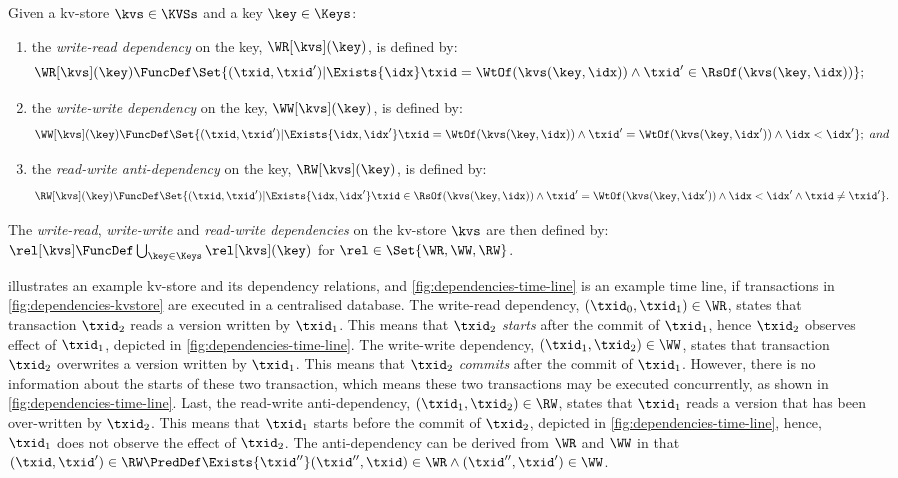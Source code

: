 

\begin{definition}
\label{def:dependency-kv-store}
Given a kv-store \(\kvs \in \KVSs\) and a key \( \key \in \Keys \):
\begin{enumerate}
\item the \emph{write-read dependency} on the key, \( \WR[\kvs](\key) \), is defined by:
    \[ 
    \WR[\kvs](\key) \FuncDef \Set{(\txid,\txid') | 
        \Exists{\idx} \txid = \WtOf(\kvs(\key,\idx)) \land \txid' \in \RsOf(\kvs(\key,\idx))} ;
    \]
\item the \emph{write-write dependency} on the key, \( \WW[\kvs](\key) \), is defined by:
    \[ 
    \WW[\kvs](\key) \FuncDef \Set{(\txid,\txid') | 
        \Exists{\idx,\idx'} \txid = \WtOf(\kvs(\key,\idx)) 
        \land \txid' = \WtOf(\kvs(\key,\idx')) \land \idx < \idx'}  ; \ and
    \]
\item the \emph{read-write anti-dependency} on the key, \( \RW[\kvs](\key) \), is defined by:
    \[ 
    \RW[\kvs](\key) \FuncDef \Set{(\txid,\txid') | 
        \Exists{\idx,\idx'} \txid \in \RsOf(\kvs(\key,\idx)) 
        \land \txid' = \WtOf(\kvs(\key,\idx')) 
        \land \idx < \idx' \land \txid \neq \txid'} .
    \]
\end{enumerate}
The \emph{write-read}, \emph{write-write} and \emph{read-write dependencies}
on the kv-store \( \kvs \) are then defined by:
\(  \rel[\kvs] \FuncDef \bigcup_{\key \in \Keys}\rel[\kvs](\key) \)
for \( \rel \in \Set{\WR, \WW, \RW} \).
\end{definition}

 illustrates an example kv-store and its dependency relations,
and \cref{fig:dependencies-time-line} is an example time line, 
if transactions in \cref{fig:dependencies-kvstore} are executed in a centralised database.
The write-read dependency, \( (\txid_0, \txid_1) \in \WR \), states that
transaction \( \txid_2 \) reads a version written by \( \txid_1 \).
This means that \( \txid_2 \) \emph{starts} after the commit of \( \txid_1 \), hence 
\( \txid_2 \) observes effect of \( \txid_1 \), depicted in \cref{fig:dependencies-time-line}.
The write-write dependency, \( (\txid_1, \txid_2) \in \WW \), states that 
transaction \( \txid_2 \) overwrites a version written by \( \txid_1 \).
This means that \( \txid_2 \) \emph{commits} after the commit of \( \txid_1 \).
However, there is no information about the starts of these two transaction,
which means these two transactions may be executed concurrently, 
as shown in \cref{fig:dependencies-time-line}.
Last, the read-write anti-dependency, \( (\txid_1,\txid_2) \in \RW \),
states that \( \txid_1 \) reads a version that has been over-written by \( \txid_2 \).
This means that \( \txid_1 \) starts before the commit of \( \txid_2 \), depicted in \cref{fig:dependencies-time-line},
hence, \( \txid_1 \) does not observe the effect of \( \txid_2 \).
The anti-dependency can be derived from \( \WR \) and \( \WW \)
in that \( (\txid,\txid') \in \RW 
        \PredDef \Exists{\txid''} (\txid'',\txid) \in \WR \land (\txid'',\txid') \in \WW \).


